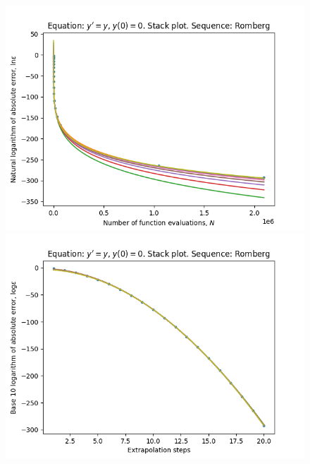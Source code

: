\begin{figure}[H]
\centering
\begin{minipage}{0.45\textwidth}
\centering
\includegraphics[scale=0.45]{emr_plots/exp_growth_hp_romberg_stack.png}
\end{minipage}
\begin{minipage}{0.45\textwidth}
\centering
\includegraphics[scale=0.45]{emr_plots/exp_growth_hp_romberg_steps_stack.png}
\end{minipage}
\end{figure}

